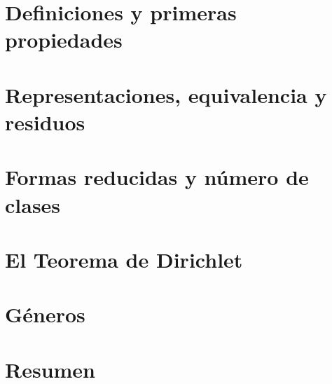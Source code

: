 \section{Definiciones y primeras propiedades}\label{sec:definiciones}


\section{Representaciones, equivalencia y residuos}\label{sec:representaciones}


\section{Formas reducidas y n\'umero de clases}\label{sec:reducidas}


\section{El Teorema de Dirichlet}\label{sec:dirichlet}


\section{G\'eneros}\label{sec:generos}


\section{Resumen}\label{sec:resumen}


